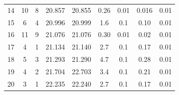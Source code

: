 \begin{table}[H]
\begin{tabular}{c|c|c|c|c|c|c|c|c}
     14 &  10 &   8 &   20.857 &       20.855 &      0.26 &  0.01 &                0.016 &    0.01 \\
     15 &   6 &   4 &   20.996 &       20.999 &      1.6 &  0.1 &                0.10 &    0.01 \\
     16 &  11 &   9 &   21.076 &       21.076 &      0.30 &  0.01 &                0.02 &    0.01 \\
     17 &   4 &   1 &   21.134 &       21.140 &      2.7 &  0.1 &                0.17 &    0.01 \\
     18 &   5 &   3 &   21.293 &       21.290 &      4.7 &  0.1 &                0.28 &    0.01 \\
     19 &   4 &   2 &   21.704 &       22.703 &      3.4 &  0.1 &                0.21 &    0.01 \\
     20 &   3 &   1 &   22.235 &       22.240 &      2.7 &  0.1 &                0.17 &    0.01 \\
\end{tabular}
\end{table}

